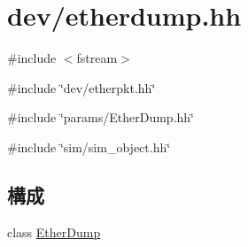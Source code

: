 \hypertarget{etherdump_8hh}{
\section{dev/etherdump.hh}
\label{etherdump_8hh}
}
{\ttfamily \#include $<$fstream$>$}\par
{\ttfamily \#include \char`\"{}dev/etherpkt.hh\char`\"{}}\par
{\ttfamily \#include \char`\"{}params/EtherDump.hh\char`\"{}}\par
{\ttfamily \#include \char`\"{}sim/sim\_\-object.hh\char`\"{}}\par
\subsection*{構成}
\begin{DoxyCompactItemize}
\item 
class \hyperlink{classEtherDump}{EtherDump}
\end{DoxyCompactItemize}
